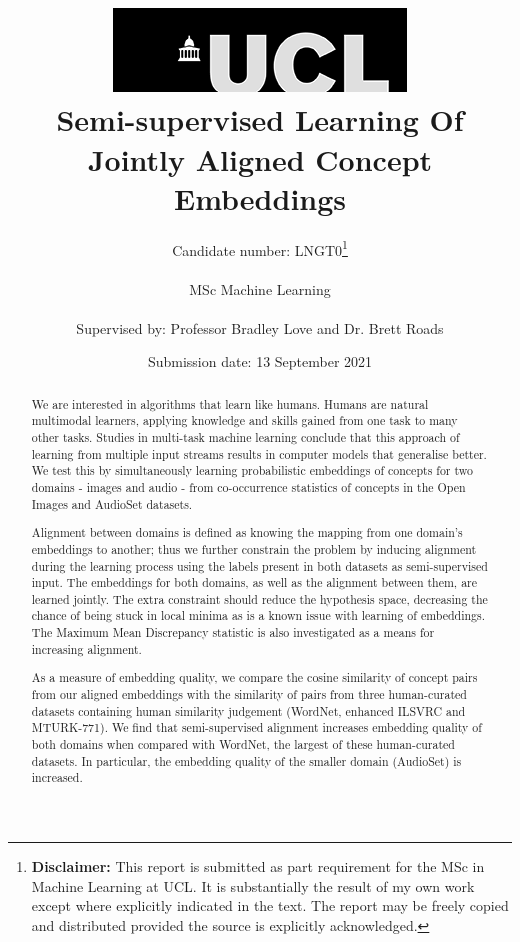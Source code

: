 \documentclass[12pt]{report}
\begin{document}
\title{  	{ \includegraphics[scale=.5]{ucl_logo.png}}\\
{{\Huge Semi-supervised Learning Of Jointly Aligned Concept Embeddings}}\\
		}
\date{Submission date: 13 September 2021}
\author{Candidate number: LNGT0\thanks{
{\bf Disclaimer:}
This report is submitted as part requirement for the MSc in Machine Learning at UCL. It is
substantially the result of my own work except where explicitly indicated in the text.
The report may be freely copied and distributed provided the source is explicitly acknowledged.
}
\\ \\
MSc Machine Learning\\ \\
Supervised by: Professor Bradley Love and Dr. Brett Roads}

 
\onehalfspacing
\maketitle
\begin{abstract}
We are interested in algorithms that learn like humans. Humans are natural multimodal learners, applying knowledge and skills gained from one task to many other tasks. Studies in multi-task machine learning conclude that this approach of learning from multiple input streams results in computer models that generalise better. We test this by simultaneously learning probabilistic embeddings of concepts for two domains - images and audio - from co-occurrence statistics of concepts in the Open Images and AudioSet datasets. 

Alignment between domains is defined as knowing the mapping from one domain's embeddings to another; thus we further constrain the problem by inducing alignment during the learning process using the labels present in both datasets as semi-supervised input. The embeddings for both domains, as well as the alignment between them, are learned jointly. The extra constraint should reduce the hypothesis space, decreasing the chance of being stuck in local minima as is a known issue with learning of embeddings. The Maximum Mean Discrepancy statistic is also investigated as a means for increasing alignment.  

As a measure of embedding quality, we compare the cosine similarity of concept pairs from our aligned embeddings with the similarity of pairs from three human-curated datasets containing human similarity judgement (WordNet, enhanced ILSVRC and MTURK-771). We find that semi-supervised alignment increases embedding quality of both domains when compared with WordNet, the largest of these human-curated datasets. In particular, the embedding quality of the smaller domain (AudioSet) is increased. 
\end{abstract}
\end{document}
